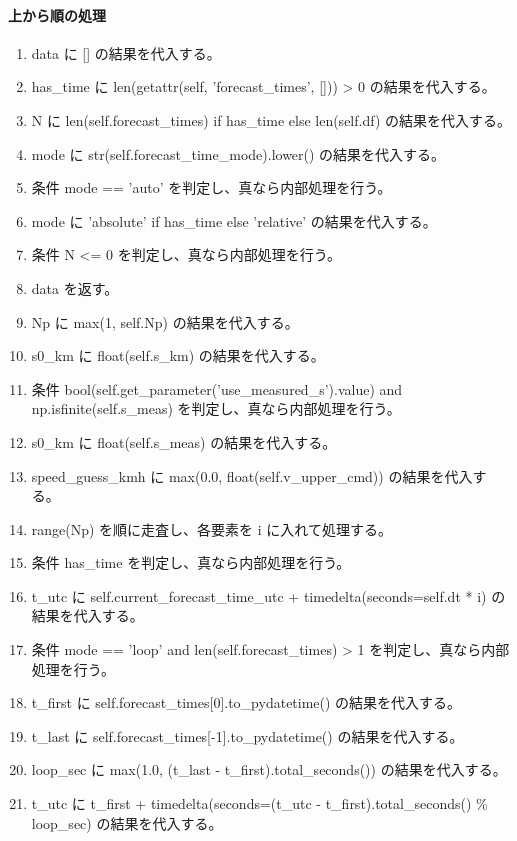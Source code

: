 \documentclass[a4paper,11pt]{article}
\begin{document}
            \paragraph{上から順の処理}
            \begin{enumerate}[leftmargin=1.8em]
            \item data に [] の結果を代入する。
\item has\_time に len(getattr(self, 'forecast\_times', [])) > 0 の結果を代入する。
\item N に len(self.forecast\_times) if has\_time else len(self.df) の結果を代入する。
\item mode に str(self.forecast\_time\_mode).lower() の結果を代入する。
\item 条件 mode == 'auto' を判定し、真なら内部処理を行う。
\item   mode に 'absolute' if has\_time else 'relative' の結果を代入する。
\item 条件 N <= 0 を判定し、真なら内部処理を行う。
\item   data を返す。
\item Np に max(1, self.Np) の結果を代入する。
\item s0\_km に float(self.s\_km) の結果を代入する。
\item 条件 bool(self.get\_parameter('use\_measured\_s').value) and np.isfinite(self.s\_meas) を判定し、真なら内部処理を行う。
\item   s0\_km に float(self.s\_meas) の結果を代入する。
\item speed\_guess\_kmh に max(0.0, float(self.v\_upper\_cmd)) の結果を代入する。
\item range(Np) を順に走査し、各要素を i に入れて処理する。
\item   条件 has\_time を判定し、真なら内部処理を行う。
\item     t\_utc に self.current\_forecast\_time\_utc + timedelta(seconds=self.dt * i) の結果を代入する。
\item     条件 mode == 'loop' and len(self.forecast\_times) > 1 を判定し、真なら内部処理を行う。
\item       t\_first に self.forecast\_times[0].to\_pydatetime() の結果を代入する。
\item       t\_last に self.forecast\_times[-1].to\_pydatetime() の結果を代入する。
\item       loop\_sec に max(1.0, (t\_last - t\_first).total\_seconds()) の結果を代入する。
\item       t\_utc に t\_first + timedelta(seconds=(t\_utc - t\_first).total\_seconds() \% loop\_sec) の結果を代入する。

\end{enumerate}
\end{document}
